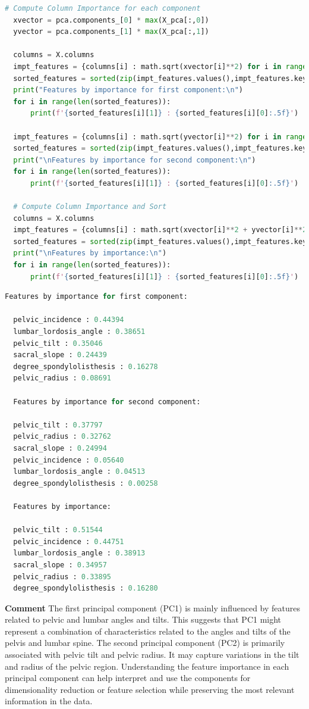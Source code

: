 \documentclass{article}
\begin{document}
\begin{lstlisting}[language=Python]
  # Compute Column Importance for each component
  xvector = pca.components_[0] * max(X_pca[:,0])
  yvector = pca.components_[1] * max(X_pca[:,1])

  columns = X.columns
  impt_features = {columns[i] : math.sqrt(xvector[i]**2) for i in range(len(columns))}
  sorted_features = sorted(zip(impt_features.values(),impt_features.keys()),reverse=True)
  print("Features by importance for first component:\n")
  for i in range(len(sorted_features)):
      print(f'{sorted_features[i][1]} : {sorted_features[i][0]:.5f}')

  impt_features = {columns[i] : math.sqrt(yvector[i]**2) for i in range(len(columns))}
  sorted_features = sorted(zip(impt_features.values(),impt_features.keys()),reverse=True)
  print("\nFeatures by importance for second component:\n")
  for i in range(len(sorted_features)):
      print(f'{sorted_features[i][1]} : {sorted_features[i][0]:.5f}')

  # Compute Column Importance and Sort
  columns = X.columns
  impt_features = {columns[i] : math.sqrt(xvector[i]**2 + yvector[i]**2) for i in range(len(columns))}
  sorted_features = sorted(zip(impt_features.values(),impt_features.keys()),reverse=True)
  print("\nFeatures by importance:\n")
  for i in range(len(sorted_features)):
      print(f'{sorted_features[i][1]} : {sorted_features[i][0]:.5f}')
\end{lstlisting}

\begin{lstlisting}[language=Python]
  Features by importance for first component:

  pelvic_incidence : 0.44394
  lumbar_lordosis_angle : 0.38651
  pelvic_tilt : 0.35046
  sacral_slope : 0.24439
  degree_spondylolisthesis : 0.16278
  pelvic_radius : 0.08691
  
  Features by importance for second component:
  
  pelvic_tilt : 0.37797
  pelvic_radius : 0.32762
  sacral_slope : 0.24994
  pelvic_incidence : 0.05640
  lumbar_lordosis_angle : 0.04513
  degree_spondylolisthesis : 0.00258
  
  Features by importance:
  
  pelvic_tilt : 0.51544
  pelvic_incidence : 0.44751
  lumbar_lordosis_angle : 0.38913
  sacral_slope : 0.34957
  pelvic_radius : 0.33895
  degree_spondylolisthesis : 0.16280
\end{lstlisting}

\textbf{Comment}
The first principal component (PC1) is mainly influenced by features related to pelvic and lumbar angles and tilts. This suggests that PC1 might represent a combination of characteristics related to the angles and tilts of the pelvis and lumbar spine.
The second principal component (PC2) is primarily associated with pelvic tilt and pelvic radius. It may capture variations in the tilt and radius of the pelvic region.
Understanding the feature importance in each principal component can help interpret and use the components for dimensionality reduction or feature selection while preserving the most relevant information in the data.
\end{document}
